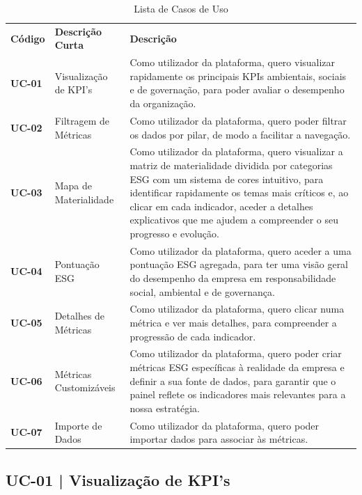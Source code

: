 \begin{table}[H]
    \renewcommand{\arraystretch}{1.2}
    \setlength{\tabcolsep}{10pt}
    \centering
    \begin{tabular}{>{\bfseries}p{1.5cm} p{3.5cm} p{8cm}}
        \rowcolor{orange!50}
        Código & \textbf{Descrição Curta} & \textbf{Descrição} \\
        UC-01 & Visualização de KPI's & Como utilizador da plataforma, quero visualizar rapidamente os principais KPIs ambientais, sociais e de governação, para poder avaliar o desempenho da organização. \\
        UC-02 & Filtragem de Métricas & Como utilizador da plataforma, quero poder filtrar os dados por pilar, de modo a facilitar a navegação. \\
        UC-03 & Mapa de Materialidade & Como utilizador da plataforma, quero visualizar a matriz de materialidade dividida por categorias ESG com um sistema de cores intuitivo, para identificar rapidamente os temas mais críticos e, ao clicar em cada indicador, aceder a detalhes explicativos que me ajudem a compreender o seu progresso e evolução. \\
        UC-04 & Pontuação ESG & Como utilizador da plataforma, quero aceder a uma pontuação ESG agregada, para ter uma visão geral do desempenho da empresa em responsabilidade social, ambiental e de governança. \\
        UC-05 & Detalhes de Métricas & Como utilizador da plataforma, quero clicar numa métrica e ver mais detalhes, para compreender a progressão de cada indicador. \\
        UC-06 & Métricas Customizáveis & Como utilizador da plataforma, quero poder criar métricas ESG específicas à realidade da empresa e definir a sua fonte de dados, para garantir que o painel reflete os indicadores mais relevantes para a nossa estratégia. \\
        UC-07 & Importe de Dados & Como utilizador da plataforma, quero poder importar dados para associar às métricas. \\      
    \end{tabular}
    \caption{Lista de Casos de Uso}
    \label{tab:use_cases}
\end{table}

\subsection{UC-01 | Visualização de KPI's}

